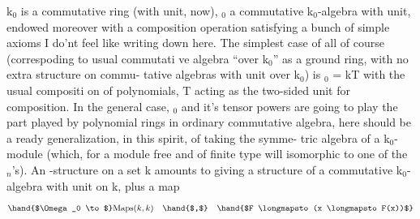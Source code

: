  k$_0$ is a commutative ring (with unit, now), \hand{$\Omega$}$_0$ a commutative k$_0$-algebra
 with unit, endowed moreover with a composition operation 
satisfying a bunch of simple axioms I do'nt feel like writing down here.
The simplest case of all of course (correspoding to  usual commutati%
ve algebra ``over k$_0$'' as a ground ring, with no extra structure on commu-%
tative algebras with unit over k$_0$) is \hand{$\Omega$}$_0$ = k\hand{[}T\hand{]}\hand{,} with the usual compositi%
on of polynomials, T acting as the two-sided unit for composition. In
the general case, \hand{$\Omega$}$_0$ and it's tensor powers  are going to play the part
played by polynomial rings in ordinary commutative algebra,  here
should be a ready generalization, in this spirit, of taking the symme-%
tric algebra of a k$_0$-module (which, for a module free and of finite type\hand{,}
will  isomorphic to one of the \hand{$\Omega$}$_n$'s). An \hand{$\Omega$}-structure on a set  k
amounts to giving a structure of a commutative k$_0$-algebra with unit on k,
plus a map
\[ \hand{$\Omega_0 \to$} \mathrm{Maps}(k,k) \quad \hand{$,$} \quad \hand{$F \longmapsto (x \longmapsto F(x))$} \]



